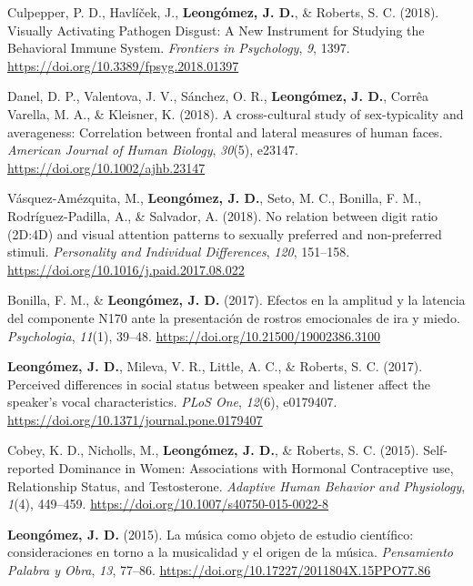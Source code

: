 \documentclass[11pt,a4paper,]{awesome-cv}
\begin{document}
\leavevmode{}%
Culpepper, P. D., Havlíček, J., \textbf{Leongómez, J. D.}, \& Roberts,
S. C. (2018). {Visually Activating Pathogen Disgust: A New Instrument
for Studying the Behavioral Immune System}. \emph{Frontiers in
Psychology}, \emph{9}, 1397.
\url{https://doi.org/10.3389/fpsyg.2018.01397}

\leavevmode{}%
Danel, D. P., Valentova, J. V., Sánchez, O. R.,
\textbf{Leongómez, J. D.}, Corrêa Varella, M. A., \& Kleisner, K.
(2018). {A cross-cultural study of sex-typicality and averageness:
Correlation between frontal and lateral measures of human faces}.
\emph{American Journal of Human Biology}, \emph{30}(5), e23147.
\url{https://doi.org/10.1002/ajhb.23147}

\leavevmode{}%
Vásquez-Amézquita, M., \textbf{Leongómez, J. D.}, Seto, M. C., Bonilla,
F. M., Rodríguez-Padilla, A., \& Salvador, A. (2018). {No relation
between digit ratio (2D:4D) and visual attention patterns to sexually
preferred and non-preferred stimuli}. \emph{Personality and Individual
Differences}, \emph{120}, 151--158.
\url{https://doi.org/10.1016/j.paid.2017.08.022}

\leavevmode{}%
Bonilla, F. M., \& \textbf{Leongómez, J. D.} (2017). {Efectos en la
amplitud y la latencia del componente N170 ante la presentaci{ó}n de
rostros emocionales de ira y miedo}. \emph{Psychologia}, \emph{11}(1),
39--48. \url{https://doi.org/10.21500/19002386.3100}

\leavevmode{}%
\textbf{Leongómez, J. D.}, Mileva, V. R., Little, A. C., \& Roberts, S.
C. (2017). {Perceived differences in social status between speaker and
listener affect the speaker's vocal characteristics}. \emph{PLoS One},
\emph{12}(6), e0179407.
\url{https://doi.org/10.1371/journal.pone.0179407}

\leavevmode{}%
Cobey, K. D., Nicholls, M., \textbf{Leongómez, J. D.}, \& Roberts, S. C.
(2015). {Self-reported Dominance in Women: Associations with Hormonal
Contraceptive use, Relationship Status, and Testosterone}.
\emph{Adaptive Human Behavior and Physiology}, \emph{1}(4), 449--459.
\url{https://doi.org/10.1007/s40750-015-0022-8}

\leavevmode{}%
\textbf{Leongómez, J. D.} (2015). {La m{ú}sica como objeto de estudio
cient{í}fico: consideraciones en torno a la musicalidad y el origen de
la m{ú}sica}. \emph{Pensamiento Palabra y Obra}, \emph{13}, 77--86.
\url{https://doi.org/10.17227/2011804X.15PPO77.86}
\end{document}
